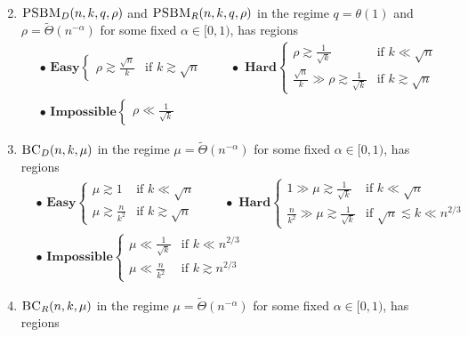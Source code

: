 \documentclass[11pt]{article}
\begin{document}
\begin{theorem}
\begin{enumerate}
\begin{align*}
\end{align*}
\item $\textsc{PSBM}_D(n, k, q, \rho)$ and $\textsc{PSBM}_R(n, k, q, \rho)$ in the regime $q = \theta(1)$ and $\rho = \tilde{\Theta}(n^{-\alpha})$ for some fixed $\alpha \in [0, 1)$, has regions
\begin{align*}
&\bullet \, \, \mathbf{Easy} \left\{ \begin{array}{ll} \rho \gtrsim \frac{\sqrt{n}}{k} &\text{if } k \gtrsim \sqrt{n} \end{array} \right. \quad \quad  \bullet \, \, \mathbf{Hard} \left\{ \begin{array}{ll} \rho \gtrsim \frac{1}{\sqrt{k}} &\text{if } k \ll \sqrt{n} \\ \frac{\sqrt{n}}{k} \gg \rho \gtrsim \frac{1}{\sqrt{k}} &\text{if } k \gtrsim \sqrt{n} \end{array} \right. \\
& \bullet \, \, \mathbf{Impossible} \left\{ \begin{array}{ll} \rho \ll \frac{1}{\sqrt{k}} \end{array} \right.
\end{align*}
\item $\textsc{BC}_D(n, k, \mu)$ in the regime $\mu = \tilde{\Theta}(n^{-\alpha})$ for some fixed $\alpha \in [0, 1)$, has regions
\begin{align*}
&\bullet \, \, \mathbf{Easy} \left\{ \begin{array}{ll} \mu \gtrsim 1 &\text{if } k \ll \sqrt{n} \\ \mu \gtrsim \frac{n}{k^2} &\text{if } k \gtrsim \sqrt{n} \end{array} \right. \quad \quad  \bullet \, \, \mathbf{Hard} \left\{ \begin{array}{ll} 1 \gg \mu \gtrsim \frac{1}{\sqrt{k}} &\text{if } k \ll \sqrt{n} \\ \frac{n}{k^2} \gg \mu \gtrsim \frac{1}{\sqrt{k}} &\text{if } \sqrt{n} \lesssim k \ll n^{2/3} \end{array} \right. \\
& \bullet \, \, \mathbf{Impossible} \left\{ \begin{array}{ll} \mu \ll \frac{1}{\sqrt{k}} &\text{if } k \ll n^{2/3} \\ \mu \ll \frac{n}{k^2} &\text{if } k \gtrsim n^{2/3} \end{array} \right.
\end{align*}
\item $\textsc{BC}_R(n, k, \mu)$ in the regime $\mu = \tilde{\Theta}(n^{-\alpha})$ for some fixed $\alpha \in [0, 1)$, has regions

\end{enumerate}
\end{theorem}
\end{document}

